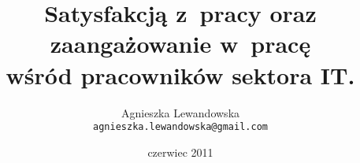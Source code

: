 \documentclass[a4paper,11pt,titlepage]{article}
\begin{document}
\title{\Large Satysfakcją z~pracy oraz zaangażowanie w~pracę \\ wśród pracowników sektora IT.}
\author{\Large{Agnieszka Lewandowska} \\ \texttt{agnieszka.lewandowska@gmail.com} }
\date{czerwiec 2011}
\maketitle


\tableofcontents
\cleardoublepage







\graphicspath{{img/group/}}

\graphicspath{{img/results/}}



\cleardoublepage


\cleardoublepage
{}


\end{document}
